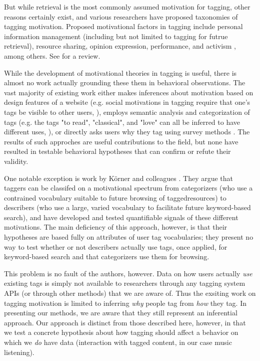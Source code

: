 But while retrieval is the most commonly assumed motivation for tagging, other reasons certainly exist, and various researchers have proposed taxonomies of tagging motivation. Proposed motivational factors in tagging include personal information management (including but not limited to tagging for futrue retrieval), resource sharing, opinion expression, performance, and activism \cite{Heckner2009,Zollers2007,Ames2007}, among others. See \cite{Gupta2010} for a review.

While the development of motivational theories in tagging is useful, there is almost no work actually grounding these them in behavioral observations. The vast majority of existing work either makes inferences about  motivation based on design features of a website (e.g. social motivations in tagging require that one's tags be visible to other users, \cite{Marlow2006}), employs semantic analysis and categorization of tags (e.g. the tags "to read", "classical", and "love" can all be inferred to have different uses, \cite{Zollers2007,Sen2006}), or directly asks users why they tag using survey methods \cite{Ames2007,Nov2008}. The results of such approches are useful contributions to the field, but none have resulted in testable behavioral hypotheses that can confirm or refute their validity. 

One notable exception is work by  K\"{o}rner and colleagues \cite{Korner2010,Korner2010a,Zubiaga2011}. They argue that taggers can be classifed on a motivational spectrum from categorizers (who use a contrained vocabulary suitable to future browsing of taggedresources) to describers (who use a large, varied vocabulary to facilitate future keyword-based search), and have developed and tested quantifiable signals of these different motivations. The main deficiency of this approach, however, is that their hypotheses are based fully on attributes of user tag vocabularies; they present no way to test whether or not describers actually use tags, once applied, for keyword-based search and that categorizers use them for browsing.

This problem is no fault of the authors, however. Data on how users actually \emph{use} existing tags is simply not available to researchers through any tagging system APIs (or through other methods) that we are aware of. Thus the exsiting work on tagging motivation is limited to inferring \emph{why} people tag from \emph{how} they tag. In presenting our methods, we are aware that they still represent an inferential approach. Our approach is distinct from those described here, however, in that we test a concrete hypothesis about how tagging should affect a behavior on which we \emph{do} have data (interaction with tagged content, in our case music listening).
